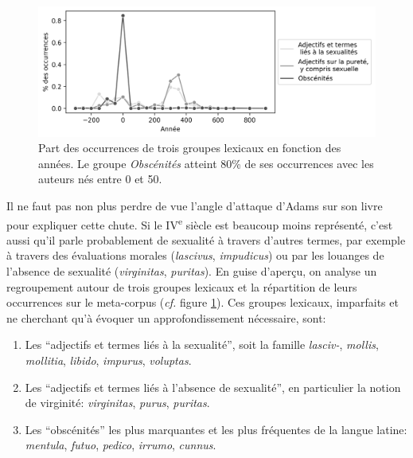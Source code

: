 \begin{figure}
    \centering
    \includegraphics[width=\linewidth]{figures/chap1/part3/exemplier/exemplier_prcentage_occs.png}
    \caption{Part des occurrences de trois groupes lexicaux en fonction des années. Le groupe \textit{Obscénités} atteint 80\% de ses occurrences avec les auteurs nés entre 0 et 50.}
    \label{fig:exemplier:lexical_groups}
\end{figure}

Il ne faut pas non plus perdre de vue l'angle d'attaque d'Adams sur son livre pour expliquer cette chute. Si le IV\textsuperscript{e} siècle est beaucoup moins représenté, c'est aussi qu'il parle probablement de sexualité à travers d'autres termes, par exemple à travers des évaluations morales (\textit{lascivus}, \textit{impudicus}) ou par les louanges de l'absence de sexualité (\textit{virginitas}, \textit{puritas}). En guise d'aperçu, on analyse un regroupement autour de trois groupes lexicaux et la répartition de leurs occurrences sur le meta-corpus (\textit{cf.} figure \ref{fig:exemplier:lexical_groups}). Ces groupes lexicaux, imparfaits et ne cherchant qu'à évoquer un approfondissement nécessaire, sont:
\begin{enumerate}
    \item Les \enquote{adjectifs et termes liés à la sexualité}, soit la famille \textit{lasciv-}, \textit{mollis}, \textit{mollitia}, \textit{libido}, \textit{impurus}, \textit{voluptas}. 
    \item Les \enquote{adjectifs et termes liés à l'absence de sexualité}, en particulier la notion de virginité: \textit{virginitas}, \textit{purus}, \textit{puritas}.
    \item Les \enquote{obscénités} les plus marquantes et les plus fréquentes de la langue latine: \textit{mentula}, \textit{futuo}, \textit{pedico}, \textit{irrumo}, \textit{cunnus}.
\end{enumerate}

